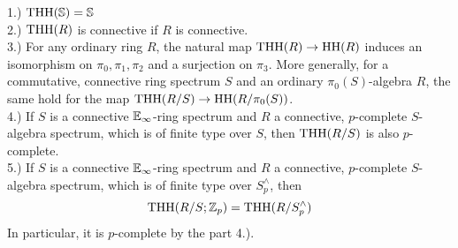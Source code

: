 \begin{lem}  \label{PropertiesTHH}

    1.) $\operatorname{THH}(\mathbb{S})=\mathbb{S}$ \\
    2.) $\operatorname{THH}(R)$ is connective if $R$ is connective.\\
    3.) For any ordinary ring $R$, the natural map $\operatorname{THH}(R)\to \operatorname{HH}(R)$ induces an isomorphism on $\pi_0,\pi_1,\pi_2$ and a surjection on $\pi_3$. More generally, for a commutative, connective ring spectrum $S$ and an ordinary $\pi_0(S)$-algebra $R$, the same hold for the map $\operatorname{THH}(R/S)\to \operatorname{HH}(R/\pi_0(S))$. \\
    4.) If $S$ is a connective $\mathbb{E}_\infty$-ring spectrum and %
    $R$ a connective, $p$-complete $S$-algebra spectrum, which is of finite type over $S$, then $\operatorname{THH}(R/S)$ is also $p$-complete.\\   
    5.) If $S$ is a connective $\mathbb{E}_\infty$-ring spectrum and $R$ a connective, $p$-complete $S$-algebra spectrum, which is of finite type over $S_p^{\wedge}$, then 
    \begin{equation*}
        \operatorname{THH}(R/S;\mathbb{Z}_p)=\operatorname{THH}(R/S_p^{\wedge})
    \end{equation*}
    In particular, it is $p$-complete by the part 4.).
\end{lem}

